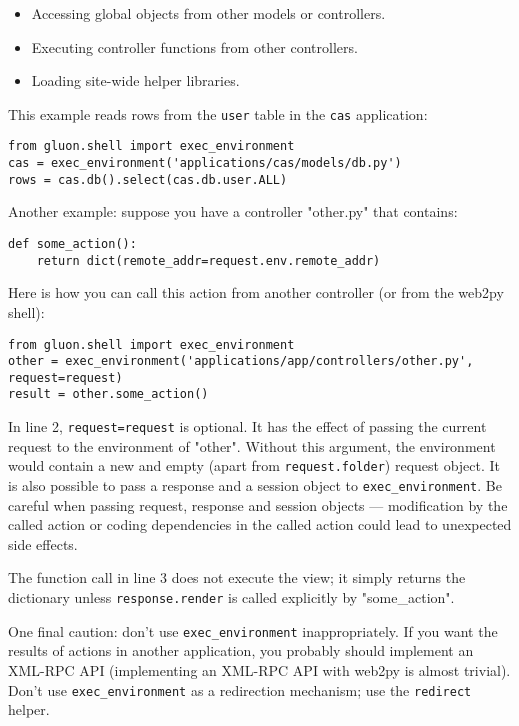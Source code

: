 \documentclass[justified,sixbynine,notoc]{tufte-book}
\def\ft{\small\tt}
\begin{document}
\begin{fullwidth}
\begin{itemize}
\item Accessing global objects from other models or controllers.

\item Executing controller functions from other controllers.

\item Loading site-wide helper libraries.
\end{itemize}

This example reads rows from the {\ft user} table in the {\ft cas} application:
\begin{lstlisting}
from gluon.shell import exec_environment
cas = exec_environment('applications/cas/models/db.py')
rows = cas.db().select(cas.db.user.ALL)
\end{lstlisting}

Another example: suppose you have a controller "other.py" that contains:
\begin{lstlisting}
def some_action():
    return dict(remote_addr=request.env.remote_addr)
\end{lstlisting}

Here is how you can call this action from another controller (or from the web2py shell):
\begin{lstlisting}
from gluon.shell import exec_environment
other = exec_environment('applications/app/controllers/other.py', request=request)
result = other.some_action()
\end{lstlisting}

In line 2, {\ft request=request} is optional. It has the effect of passing the current request to the environment of "other". Without this argument, the environment would contain a new and empty (apart from {\ft request.folder}) request object. It is also possible to pass a response and a session object to {\ft exec\_environment}. Be careful when passing request, response and session objects --- modification by the called action or coding dependencies in the called action could lead to unexpected side effects.

The function call in line 3 does not execute the view; it simply returns the dictionary unless {\ft response.render} is called explicitly by "some\_action".

One final caution: don't use {\ft exec\_environment} inappropriately. If you want the results of actions in another application, you probably should implement an XML-RPC API (implementing an XML-RPC API with web2py is almost trivial). Don't use {\ft exec\_environment} as a redirection mechanism; use the {\ft redirect} helper.


\end{fullwidth}
\end{document}
